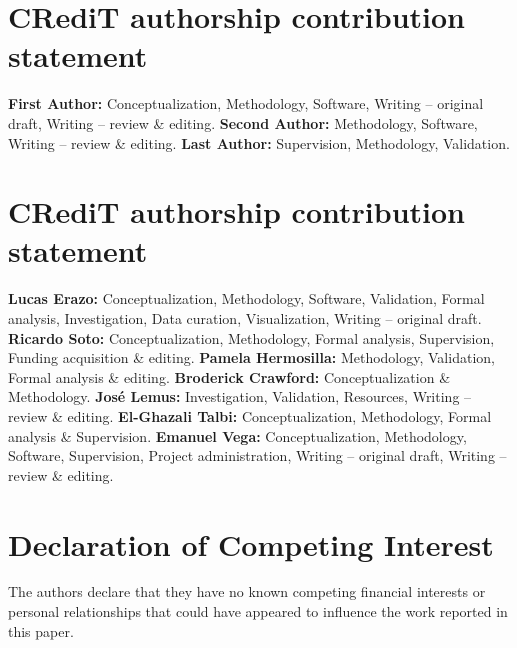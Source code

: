 \documentclass[review]{elsarticle}
\begin{document}
\section*{CRediT authorship contribution statement}
\textbf{First Author:} Conceptualization, Methodology, Software, Writing – original draft, Writing – review \& editing. \textbf{Second Author:} Methodology, Software, Writing – review \& editing. \textbf{Last Author:} Supervision, Methodology, Validation.

\section*{CRediT authorship contribution statement}
\textbf{Lucas Erazo:} Conceptualization, Methodology, Software, Validation, Formal analysis, Investigation, Data curation, Visualization, Writing -- original draft.
\textbf{Ricardo Soto:} Conceptualization, Methodology, Formal analysis, Supervision, Funding acquisition \& editing.
\textbf{Pamela Hermosilla:} Methodology, Validation, Formal analysis \& editing.
\textbf{Broderick Crawford:} Conceptualization \& Methodology.
\textbf{José Lemus:} Investigation, Validation, Resources, Writing -- review \& editing.
\textbf{El-Ghazali Talbi:} Conceptualization, Methodology, Formal analysis \& Supervision.
\textbf{Emanuel Vega:} Conceptualization, Methodology, Software, Supervision, Project administration, Writing -- original draft, Writing -- review \& editing.

\section*{Declaration of Competing Interest}
The authors declare that they have no known competing financial interests or personal relationships that could have appeared to influence the work reported in this paper.
\end{document}
